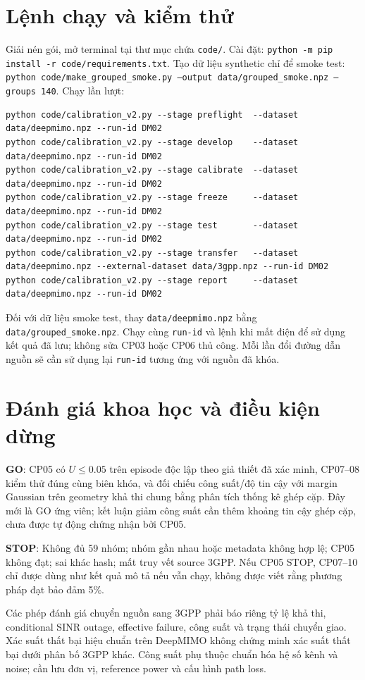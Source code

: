 \documentclass[onecolumn,11pt]{IEEEtran}
\begin{document}
\section{Lệnh chạy và kiểm thử}
Giải nén gói, mở terminal tại thư mục chứa \texttt{code/}. Cài đặt: \texttt{python -m pip install -r code/requirements.txt}. Tạo dữ liệu synthetic chỉ để smoke test: \texttt{python code/make\_grouped\_smoke.py --output data/grouped\_smoke.npz --groups 140}. Chạy lần lượt:
\begin{verbatim}
python code/calibration_v2.py --stage preflight  --dataset data/deepmimo.npz --run-id DM02
python code/calibration_v2.py --stage develop    --dataset data/deepmimo.npz --run-id DM02
python code/calibration_v2.py --stage calibrate  --dataset data/deepmimo.npz --run-id DM02
python code/calibration_v2.py --stage freeze     --dataset data/deepmimo.npz --run-id DM02
python code/calibration_v2.py --stage test       --dataset data/deepmimo.npz --run-id DM02
python code/calibration_v2.py --stage transfer   --dataset data/deepmimo.npz --external-dataset data/3gpp.npz --run-id DM02
python code/calibration_v2.py --stage report     --dataset data/deepmimo.npz --run-id DM02
\end{verbatim}
Đối với dữ liệu smoke test, thay \texttt{data/deepmimo.npz} bằng \texttt{data/grouped\_smoke.npz}. Chạy cùng \texttt{run-id} và lệnh khi mất điện để sử dụng kết quả đã lưu; không sửa CP03 hoặc CP06 thủ công. Mỗi lần đổi đường dẫn nguồn sẽ cần sử dụng lại \texttt{run-id} tương ứng với nguồn đã khóa.

\section{Đánh giá khoa học và điều kiện dừng}
\textbf{GO}: CP05 có $U\le0.05$ trên episode độc lập theo giả thiết đã xác minh, CP07--08 kiểm thử đúng cùng biên khóa, và đối chiếu công suất/độ tin cậy với margin Gaussian trên geometry khả thi chung bằng phân tích thống kê ghép cặp. Đây mới là GO ứng viên; kết luận giảm công suất cần thêm khoảng tin cậy ghép cặp, chưa được tự động chứng nhận bởi CP05.

\textbf{STOP}: Không đủ 59 nhóm; nhóm gần nhau hoặc metadata không hợp lệ; CP05 không đạt; sai khác hash; mất truy vết source 3GPP. Nếu CP05 STOP, CP07--10 chỉ được dùng như kết quả mô tả nếu vẫn chạy, không được viết rằng phương pháp đạt bảo đảm 5\%.

Các phép đánh giá chuyển nguồn sang 3GPP phải báo riêng tỷ lệ khả thi, conditional SINR outage, effective failure, công suất và trạng thái chuyển giao. Xác suất thất bại hiệu chuẩn trên DeepMIMO không chứng minh xác suất thất bại dưới phân bố 3GPP khác. Công suất phụ thuộc chuẩn hóa hệ số kênh và noise; cần lưu đơn vị, reference power và cấu hình path loss.
\end{document}

